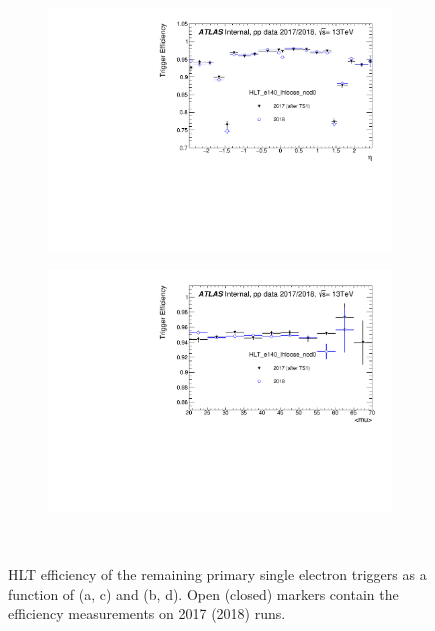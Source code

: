 \begin{figure}[h!tb]
\begin{subfigure}[c]{.48\textwidth}
\includegraphics[width=\textwidth]{sections/operation/figures/efficiencies/eff_EGAM1_e140_lhloose_nod0_L1EM24VHI_2017_after_ts1_and_2018_eta.pdf}
\caption{}
\end{subfigure}
\hfill
\begin{subfigure}[c]{.48\textwidth}
\includegraphics[width=\textwidth]{sections/operation/figures/efficiencies/eff_EGAM1_e140_lhloose_nod0_L1EM24VHI_2017_after_ts1_and_2018_mu.pdf}
\caption{}
\end{subfigure} \\
\caption{\label{fig:primary_triggers_comp_e60_e140_2018}HLT efficiency of the remaining
primary single electron triggers as a function of \eta (a, c) and \avgmu (b, d).
Open (closed) markers contain the efficiency measurements on 2017 (2018) runs.}
\end{figure}


